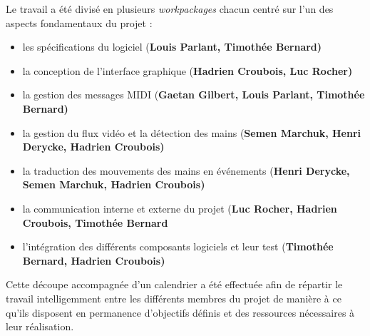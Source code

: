 \par Le travail a été divisé en plusieurs \emph{workpackages} chacun centré sur l'un des aspects fondamentaux du projet :
\begin{itemize}
    \item les spécifications du logiciel (\bf{Louis Parlant}, Timothée Bernard)
    \item la conception de l'interface graphique (\bf{Hadrien Croubois}, Luc Rocher)
    \item la gestion des messages MIDI (\bf{Gaetan Gilbert}, Louis Parlant, Timothée Bernard)
    \item la gestion du flux vidéo et la détection des mains (\bf{Semen Marchuk}, Henri Derycke, Hadrien Croubois)
    \item la traduction des mouvements des mains en événements (\bf{Henri Derycke}, Semen Marchuk, Hadrien Croubois)
    \item la communication interne et externe du projet (\bf{Luc Rocher}, Hadrien Croubois, Timothée Bernard
    \item l'intégration des différents composants logiciels et leur test (\bf{Timothée Bernard}, Hadrien Croubois)
\end{itemize}
\par Cette découpe accompagnée d'un calendrier a été effectuée afin de répartir le travail intelligemment entre les différents membres du projet de manière à ce qu'ils disposent en permanence d'objectifs définis et des ressources nécessaires à leur réalisation.
